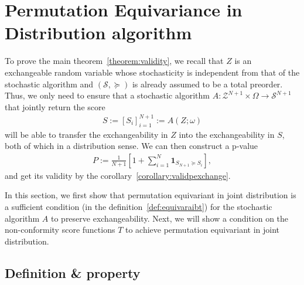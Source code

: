 \documentclass{article}
\newcommand{\oo}[1]{\left( #1 \right)}
\newcommand{\cc}[1]{\left[ #1 \right]}
\begin{document}
\section{Permutation Equivariance in Distribution algorithm}
\label{appendix:Equi}

    To prove the main theorem~\ref{theorem:validity}, we recall that $Z$ is an exchangeable random variable whose stochasticity is independent from that of the stochastic algorithm and $\oo{\mathcal{S},\succcurlyeq}$ is already assumed to be a total preorder. Thus, we only need to ensure that a stochastic algorithm $A: \mathcal{Z}^{N+1} \times \Omega \to \mathcal{S}^{N+1}$ that jointly return the score
    \begin{align*}
        S := \cc{S_i}_{i=1}^{N+1} := A(Z; \omega)
    \end{align*}
    will be able to transfer the exchangeability in $Z$ into the exchangeability in $S$, both of which in a distribution sense. We can then construct a p-value
    \begin{align*}
        P := \frac{1}{N+1}\cc{1+\sum_{i=1}^N \mathbf{1}_{S_{N+1} \succcurlyeq S_i}},
    \end{align*}
    and get its validity by the corollary~\ref{corollary:validpexchange}.

    In this section, we first show that permutation equivariant in joint distribution is a sufficient condition (in the definition~\ref{def:equivaraibt}) for the stochastic algorithm $A$ to preserve exchangeability. Next, we will show a condition on the non-conformity score functions $T$ to achieve permutation equivariant in joint distribution.

    \subsection{Definition \& property}
    
\end{document}
